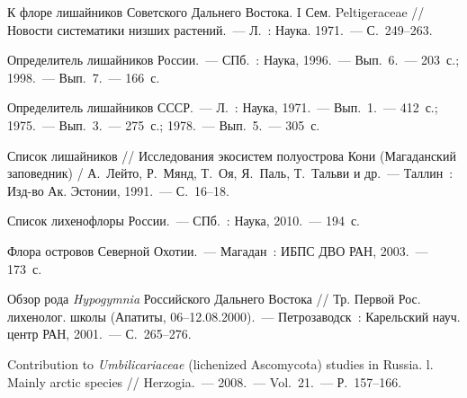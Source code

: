\begin{thebibliography}{99}
\bibitem{} К флоре лишайников Советского Дальнего Востока. I Сем. Peltigeraceae // Новости систематики низших растений.~--- Л.~: Наука. 1971.~--- С.~249--263.

\bibitem{}Определитель лишайников России.~--- СПб.~: Наука, 1996.~--- Вып.~6.~--- 203~с.; 1998.~--- Вып.~7.~--- 166~с.

\bibitem{}Определитель лишайников СССР.~--- Л.~: Наука, 1971.~--- Вып.~1.~--- 412~с.; 1975.~--- Вып.~3.~--- 275~с.; 1978.~--- Вып.~5.~--- 305~с.

\bibitem{} Список лишайников // Исследования экосистем полуострова Кони (Магаданский заповедник) / А.~Лейто, Р.~Мянд, Т.~Оя, Я.~Паль, Т.~Тальви и др.~--- Таллин~: Изд-во Ак. Эстонии, 1991.~--- С.~16--18.

\bibitem{} Список лихенофлоры России.~--- СПб.~: Наука, 2010.~--- 194~с.

\bibitem{} Флора островов Северной Охотии.~--- Магадан~: ИБПС ДВО РАН, 2003.~--- 173~с.

\bibitem{} Обзор рода \textit{Hypogymnia} Российского Дальнего Востока // Тр. Первой Рос. лихенолог. школы (Апатиты, 06--12.08.2000).~--- Петрозаводск~: Карельский науч. центр РАН, 2001.~--- С.~265--276.

\bibitem{} Contribution to \textit{Umbilicariaceae} (lichenized Ascomycota) studies in Russia. l. Mainly arctic species // Herzogia.~--- 2008.~--- Vol.~21.~--- Р.~157--166.

\end{thebibliography}
